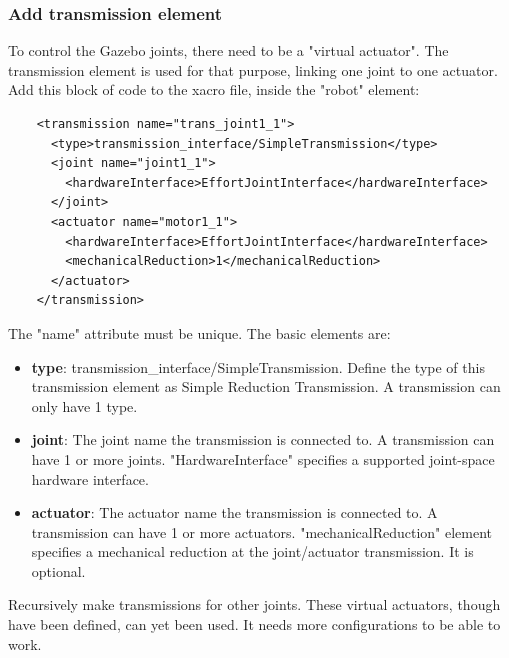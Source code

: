 \documentclass[pdftex,12pt,a4paper]{article}
\begin{document}
  \subsubsection{Add transmission element}
  To control the Gazebo joints, there need to be a "virtual actuator". The transmission element is used for that purpose, linking one joint to one actuator. Add this block of code to the xacro file, inside the "robot" element:
  \begin{lstlisting}
    <transmission name="trans_joint1_1">
      <type>transmission_interface/SimpleTransmission</type>
      <joint name="joint1_1">
        <hardwareInterface>EffortJointInterface</hardwareInterface>
      </joint>
      <actuator name="motor1_1">
        <hardwareInterface>EffortJointInterface</hardwareInterface>
        <mechanicalReduction>1</mechanicalReduction>
      </actuator>
    </transmission>
  \end{lstlisting}
  The "name" attribute must be unique. The basic elements are:
  \begin{itemize}
  \item \textbf{type}: transmission\_interface/SimpleTransmission. Define the type of this transmission element as Simple Reduction Transmission. A transmission can only have 1 type.
  \item \textbf{joint}: The joint name the transmission is connected to. A transmission can have 1 or more joints. "HardwareInterface" specifies a supported joint-space hardware interface.
  \item  \textbf{actuator}: The actuator name the transmission is connected to. A transmission can have 1 or more actuators. "mechanicalReduction" element specifies a mechanical reduction at the joint/actuator transmission. It is optional.
  \end{itemize}
  Recursively make transmissions for other joints. These virtual actuators, though have been defined, can yet been used. It needs more configurations to be able to work.
  
  \newpage
\end{document}
